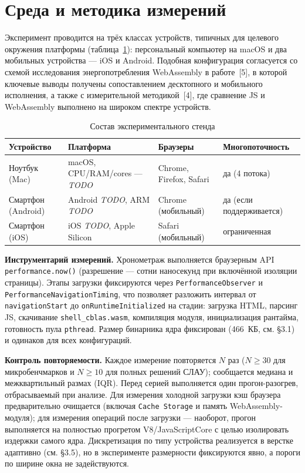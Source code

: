 \documentclass[12pt, oneside]{book}
\begin{document}
\section{Среда и методика измерений}
\label{sec:exp_method}

    \quad Эксперимент проводится на трёх классах устройств, типичных для целевого окружения платформы (таблица~\ref{tab:exp_testbed}): персональный компьютер на macOS и два мобильных устройства --- iOS и Android. Подобная конфигурация согласуется со схемой исследования энергопотребления WebAssembly в работе~[5], в которой ключевые выводы получены сопоставлением десктопного и мобильного исполнения, а также с измерительной методикой~[4], где сравнение JS и WebAssembly выполнено на широком спектре устройств.

\begin{table}[htbp]
\centering
\scriptsize
\renewcommand{\arraystretch}{1.2}
\begin{tabular}{|p{2.6cm}|p{4.0cm}|p{2.7cm}|p{3.0cm}|}
\hline
\rowcolor{thbg} \textbf{Устройство} & \textbf{Платформа} & \textbf{Браузеры} & \textbf{Многопоточность} \\
\hline
Ноутбук (Mac) & macOS, CPU/RAM/cores --- \textit{TODO} & Chrome, Firefox, Safari & да (4 потока) \\
\hline
Смартфон (Android) & Android \textit{TODO}, ARM \textit{TODO} & Chrome (мобильный) & да (если поддерживается) \\
\hline
Смартфон (iOS) & iOS \textit{TODO}, Apple Silicon & Safari (мобильный) & ограниченная \\
\hline
\end{tabular}
\caption{Состав экспериментального стенда}
\label{tab:exp_testbed}
\end{table}

    \quad \textbf{Инструментарий измерений.} Хронометраж выполняется браузерным API \texttt{performance.now()} (разрешение --- сотни наносекунд при включённой изоляции страницы). Этапы загрузки фиксируются через \texttt{Performance\-Observer} и \texttt{PerformanceNavigationTiming}, что позволяет разложить интервал от \texttt{navigation\-Start} до \texttt{onRuntime\-Initialized} на стадии: загрузка HTML, парсинг JS, скачивание \texttt{shell\_cblas.wasm}, компиляция модуля, инициализация рантайма, готовность пула \texttt{pthread}. Размер бинарника ядра фиксирован (466~КБ, см. §3.1) и одинаков для всех конфигураций.

    \quad \textbf{Контроль повторяемости.} Каждое измерение повторяется $N$ раз ($N \ge 30$ для микробенчмарков и $N \ge 10$ для полных решений СЛАУ); сообщается медиана и межквартильный размах (IQR). Перед серией выполняется один прогон-разогрев, отбрасываемый при анализе. Для измерения холодной загрузки кэш браузера предварительно очищается (включая \texttt{Cache Storage} и память WebAssembly-модуля); для измерения операций после загрузки --- наоборот, прогон выполняется на полностью прогретом V8/JavaScriptCore с целью изолировать издержки самого ядра. Дискретизация по типу устройства реализуется в верстке адаптивно (см. §3.5), но в эксперименте размерности фиксируются явно, а пороги по ширине окна не задействуются.
\end{document}
